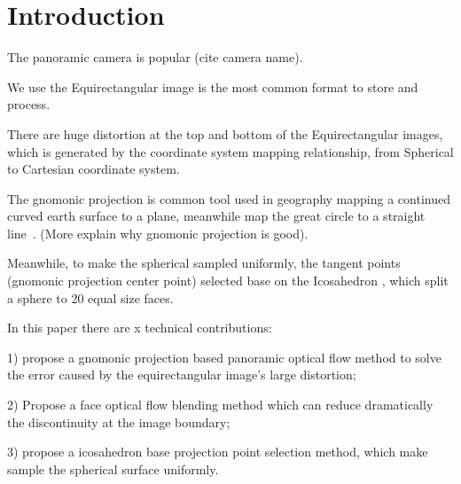 \section{Introduction}\label{sec:intro}

The panoramic camera is popular (cite camera name).

We use the Equirectangular image is the most common format to store and process.

There are huge distortion at the top and bottom of the Equirectangular images, which is generated by the coordinate system mapping relationship, from Spherical to Cartesian coordinate system.

The gnomonic projection is common tool used in geography mapping a continued curved earth surface to a plane, meanwhile map the great circle to a straight line~\cite{todo}. (More explain why gnomonic projection is good).

Meanwhile, to make the spherical sampled uniformly, the tangent points (gnomonic projection center point) selected base on the Icosahedron , which split a sphere to 20 equal size faces.

In this paper there are x technical contributions:

1) propose a gnomonic projection based panoramic optical flow method to solve the error caused by the equirectangular image's large distortion;

2) Propose a face optical flow blending method which can reduce dramatically the discontinuity at the image boundary;

3) propose a icosahedron base projection point selection method, which make sample the spherical surface uniformly.
